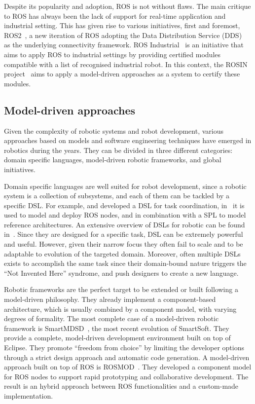 Despite its popularity and adoption, ROS is not without flaws. The main critique to ROS has always been the lack of support for real-time application and industrial setting. This has given rise to various initiatives, first and foremost, ROS2~\cite{ros2}, a new iteration of ROS adopting the Data Distribution Service (DDS)~\cite{pardo2003omg} as the underlying connectivity framework. ROS Industrial~\cite{edwards2012ros} is an initiative that aims to apply ROS to industrial settings by providing certified modules compatible with a list of recognised industrial robot. In this context, the ROSIN project~\cite{rosin} aims to apply a model-driven approaches as a system to certify these modules.

\subsection{Model-driven approaches}
Given the complexity of robotic systems and robot development, various approaches based on models and software engineering techniques have emerged in robotics during the years. They can be divided in three different categories: domain specific languages, model-driven robotic frameworks, and global initiatives.

Domain specific languages are well suited for robot development, since a robotic system is a collection of subsystems, and each of them can be tackled by a specific DSL. For example, \cite{steck2011managing} and \cite{klotzbucher2012coordinating} developed a DSL for task coordination, in~\cite{hochgeschwender2013model} it is used to model and deploy ROS nodes, and \cite{gherardi2011eclipse} in combination with a SPL to model reference architectures. An extensive overview of DSLs for robotic can be found in~\cite{nordmann2014survey}. Since they are designed for a specific task, DSL can be extremely powerful and useful. However, given their narrow focus they often fail to scale and to be adaptable to evolution of the targeted domain. Moreover, often multiple DSLs exists to accomplish the same task since their domain-bound nature triggers the ``Not Invented Here'' syndrome, and push designers to create a new language.

Robotic frameworks are the perfect target to be extended or built following a model-driven philosophy. They already implement a component-based architecture, which is usually combined by a component model, with varying degrees of formality. The most complete case of a model-driven robotic framework is SmartMDSD~\cite{dennis2016smartmdsd}, the most recent evolution of SmartSoft. They provide a complete, model-driven development environment built on top of Eclipse. They promote ``freedom from choice'' by limiting the developer options through a strict design approach and automatic code generation. A model-driven approach built on top of ROS is ROSMOD~\cite{kumar2016rosmod}. They developed a component model for ROS nodes to support rapid prototyping and collaborative development. The result is an hybrid approach between ROS functionalities and a custom-made implementation.

